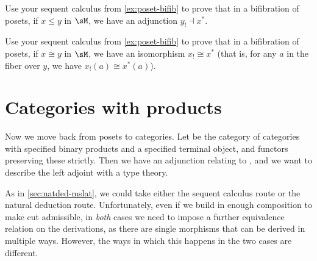 \documentclass{book}
\begin{document}
\begin{ex}\label{ex:poset-bifib-adj}
  Use your sequent calculus from \cref{ex:poset-bifib} to prove that in a bifibration of posets, if $x\le y$ in $\sM$, we have an adjunction $y_! \dashv x^*$.
\end{ex}

\begin{ex}\label{ex:poset-bifib-iso}
  Use your sequent calculus from \cref{ex:poset-bifib} to prove that in a bifibration of posets, if $x\cong y$ in $\sM$, we have an isomorphism $x_! \cong x^*$ (that is, for any $a$ in the fiber over $y$, we have $x_!(a) \cong x^*(a)$).
\end{ex}


\section{Categories with products}
\label{sec:catprod}\label{sec:beta-eta}

Now we move back from posets to categories.
Let \bPrCat be the category of categories with specified binary products and a specified terminal object, and functors preserving these strictly.
Then we have an adjunction relating \bPrCat to \bGr, and we want to describe the left adjoint with a type theory.

As in \cref{sec:natded-mslat}, we could take either the sequent calculus route or the natural deduction route.
Unfortunately, even if we build in enough composition to make cut admissible, in \emph{both} cases we need to impose a further equivalence relation on the derivations, as there are single morphisms that can be derived in multiple ways.
However, the ways in which this happens in the two cases are different.
\end{document}
